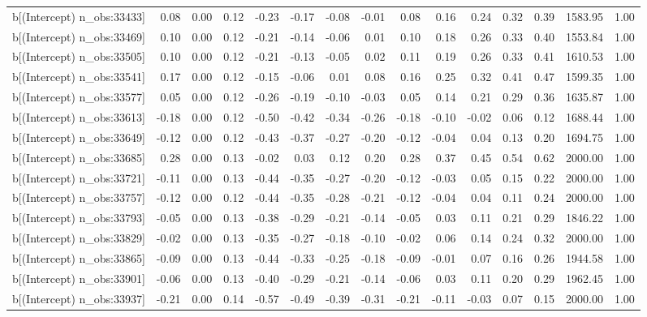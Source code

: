 \begin{table}[ht]
\begin{tabular}{rrrrrrrrrrrrrrr}
  b[(Intercept) n\_obs:33433] & 0.08 & 0.00 & 0.12 & -0.23 & -0.17 & -0.08 & -0.01 & 0.08 & 0.16 & 0.24 & 0.32 & 0.39 & 1583.95 & 1.00 \\ 
  b[(Intercept) n\_obs:33469] & 0.10 & 0.00 & 0.12 & -0.21 & -0.14 & -0.06 & 0.01 & 0.10 & 0.18 & 0.26 & 0.33 & 0.40 & 1553.84 & 1.00 \\ 
  b[(Intercept) n\_obs:33505] & 0.10 & 0.00 & 0.12 & -0.21 & -0.13 & -0.05 & 0.02 & 0.11 & 0.19 & 0.26 & 0.33 & 0.41 & 1610.53 & 1.00 \\ 
  b[(Intercept) n\_obs:33541] & 0.17 & 0.00 & 0.12 & -0.15 & -0.06 & 0.01 & 0.08 & 0.16 & 0.25 & 0.32 & 0.41 & 0.47 & 1599.35 & 1.00 \\ 
  b[(Intercept) n\_obs:33577] & 0.05 & 0.00 & 0.12 & -0.26 & -0.19 & -0.10 & -0.03 & 0.05 & 0.14 & 0.21 & 0.29 & 0.36 & 1635.87 & 1.00 \\ 
  b[(Intercept) n\_obs:33613] & -0.18 & 0.00 & 0.12 & -0.50 & -0.42 & -0.34 & -0.26 & -0.18 & -0.10 & -0.02 & 0.06 & 0.12 & 1688.44 & 1.00 \\ 
  b[(Intercept) n\_obs:33649] & -0.12 & 0.00 & 0.12 & -0.43 & -0.37 & -0.27 & -0.20 & -0.12 & -0.04 & 0.04 & 0.13 & 0.20 & 1694.75 & 1.00 \\ 
  b[(Intercept) n\_obs:33685] & 0.28 & 0.00 & 0.13 & -0.02 & 0.03 & 0.12 & 0.20 & 0.28 & 0.37 & 0.45 & 0.54 & 0.62 & 2000.00 & 1.00 \\ 
  b[(Intercept) n\_obs:33721] & -0.11 & 0.00 & 0.13 & -0.44 & -0.35 & -0.27 & -0.20 & -0.12 & -0.03 & 0.05 & 0.15 & 0.22 & 2000.00 & 1.00 \\ 
  b[(Intercept) n\_obs:33757] & -0.12 & 0.00 & 0.12 & -0.44 & -0.35 & -0.28 & -0.21 & -0.12 & -0.04 & 0.04 & 0.11 & 0.24 & 2000.00 & 1.00 \\ 
  b[(Intercept) n\_obs:33793] & -0.05 & 0.00 & 0.13 & -0.38 & -0.29 & -0.21 & -0.14 & -0.05 & 0.03 & 0.11 & 0.21 & 0.29 & 1846.22 & 1.00 \\ 
  b[(Intercept) n\_obs:33829] & -0.02 & 0.00 & 0.13 & -0.35 & -0.27 & -0.18 & -0.10 & -0.02 & 0.06 & 0.14 & 0.24 & 0.32 & 2000.00 & 1.00 \\ 
  b[(Intercept) n\_obs:33865] & -0.09 & 0.00 & 0.13 & -0.44 & -0.33 & -0.25 & -0.18 & -0.09 & -0.01 & 0.07 & 0.16 & 0.26 & 1944.58 & 1.00 \\ 
  b[(Intercept) n\_obs:33901] & -0.06 & 0.00 & 0.13 & -0.40 & -0.29 & -0.21 & -0.14 & -0.06 & 0.03 & 0.11 & 0.20 & 0.29 & 1962.45 & 1.00 \\ 
  b[(Intercept) n\_obs:33937] & -0.21 & 0.00 & 0.14 & -0.57 & -0.49 & -0.39 & -0.31 & -0.21 & -0.11 & -0.03 & 0.07 & 0.15 & 2000.00 & 1.00 \\ 

\end{tabular}
\end{table}
